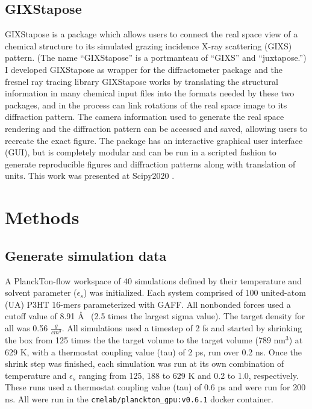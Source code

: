 \subsection{GIXStapose}
GIXStapose is a package which allows users to connect the real space view of a chemical structure to its simulated grazing incidence X-ray scattering (GIXS) pattern. (The name ``GIXStapose'' is a portmanteau of ``GIXS'' and ``juxtapose.'') 
I developed GIXStapose as wrapper for the diffractometer package and the fresnel ray tracing library \cite{Diffract, Jones2017, fresnel}
GIXStapose works by translating the structural information in many chemical input files into the formats needed by these two packages, and in the process can link rotations of the real space image to its diffraction pattern. 
The camera information used to generate the real space rendering and the diffraction pattern can be accessed and saved, allowing users to recreate the exact figure.
The package has an interactive graphical user interface (GUI), but is completely modular and can be run in a scripted fashion to generate reproducible figures and diffraction patterns along with translation of units. 
This work was presented at Scipy2020 \cite{gixstapose-scipy}. 

\section{Methods}
\subsection{Generate simulation data}
A PlanckTon-flow workspace of 40 simulations defined by their temperature and solvent parameter ($\epsilon_{s}$) was initialized. Each system comprised of 100 united-atom (UA) P3HT 16-mers parameterized with GAFF. %
All nonbonded forces used a cutoff value of 8.91 \AA~ (2.5 times the largest sigma value). The target density for all was 0.56 $\frac{g}{cm^{3}}$. All simulations used a timestep of 2 fs and started by shrinking the box from 125 times the the target volume to the target volume (789 nm$^3$) at 629 K, with a thermostat coupling value (tau) of 2 ps, run over 0.2 ns. Once the shrink step was finished, each simulation was run at its own combination of temperature and $\epsilon_{s}$ ranging from 125, 188 to 629 K and 0.2 to 1.0, respectively. These runs used a thermostat coupling value (tau) of 0.6 ps and were run for 200 ns. All were run in the \lstinline{cmelab/planckton_gpu:v0.6.1} docker container.

